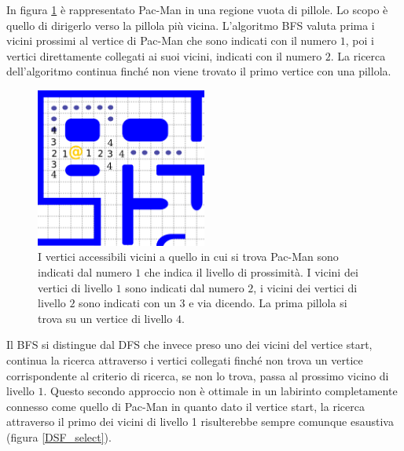 \documentclass[8pt]{book}
\begin{document}
In figura \ref{BSF_select_1} è rappresentato Pac-Man in una regione vuota di pillole. Lo scopo è quello di dirigerlo verso la pillola più vicina. L'algoritmo BFS valuta prima i vicini prossimi al vertice di Pac-Man che sono indicati con il numero $1$, poi i vertici direttamente collegati ai suoi vicini, indicati con il numero $2$. La ricerca dell'algoritmo continua finché non viene trovato il primo vertice con una pillola.\\

\begin{figure}
  \centering
  \includegraphics[width=0.5\textwidth]{img/BSF_select_1.png}
  \caption{I vertici accessibili vicini a quello in cui si trova Pac-Man sono indicati dal numero $1$ che indica il livello di prossimità. I vicini dei vertici di livello $1$ sono indicati dal numero $2$, i vicini dei vertici di livello $2$ sono indicati con un $3$ e via dicendo. La prima pillola si trova su un vertice di livello $4$.}
  \label{BSF_select_1}
\end{figure}


Il BFS si distingue dal DFS che invece preso uno dei vicini del vertice start, continua la ricerca attraverso i vertici collegati finché non trova un vertice corrispondente al criterio di ricerca, se non lo trova, passa al prossimo vicino di livello $1$. Questo secondo approccio non è ottimale in un labirinto completamente connesso come quello di Pac-Man in quanto dato il vertice start, la ricerca attraverso il primo dei vicini di livello 1 risulterebbe sempre comunque esaustiva (figura \ref{DSF_select}).
\end{document}
